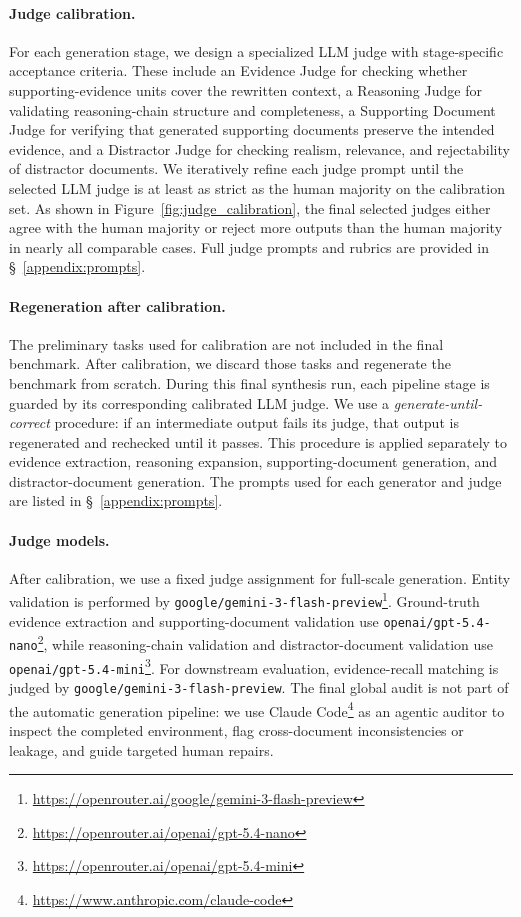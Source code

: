 \documentclass[]{servicenow}
\begin{document}
\paragraph{Judge calibration.}
For each generation stage, we design a specialized LLM judge with stage-specific acceptance criteria. These include an Evidence Judge for checking whether supporting-evidence units cover the rewritten context, a Reasoning Judge for validating reasoning-chain structure and completeness, a Supporting Document Judge for verifying that generated supporting documents preserve the intended evidence, and a Distractor Judge for checking realism, relevance, and rejectability of distractor documents. We iteratively refine each judge prompt until the selected LLM judge is at least as strict as the human majority on the calibration set. As shown in Figure~\ref{fig:judge_calibration}, the final selected judges either agree with the human majority or reject more outputs than the human majority in nearly all comparable cases. Full judge prompts and rubrics are provided in \S~\ref{appendix:prompts}.

\paragraph{Regeneration after calibration.}
The preliminary tasks used for calibration are not included in the final benchmark. After calibration, we discard those tasks and regenerate the benchmark from scratch. During this final synthesis run, each pipeline stage is guarded by its corresponding calibrated LLM judge. We use a \emph{generate-until-correct} procedure: if an intermediate output fails its judge, that output is regenerated and rechecked until it passes. This procedure is applied separately to evidence extraction, reasoning expansion, supporting-document generation, and distractor-document generation. The prompts used for each generator and judge are listed in \S~\ref{appendix:prompts}.

\paragraph{Judge models.}
After calibration, we use a fixed judge assignment for full-scale generation. Entity validation is performed by \texttt{google/gemini-3-flash-preview}\footnote{\url{https://openrouter.ai/google/gemini-3-flash-preview}}. Ground-truth evidence extraction and supporting-document validation use \texttt{openai/gpt-5.4-nano}\footnote{\url{https://openrouter.ai/openai/gpt-5.4-nano}}, while reasoning-chain validation and distractor-document validation use \texttt{openai/gpt-5.4-mini}\footnote{\url{https://openrouter.ai/openai/gpt-5.4-mini}}. For downstream evaluation, evidence-recall matching is judged by \texttt{google/gemini-3-flash-preview}. The final global audit is not part of the automatic generation pipeline: we use Claude Code\footnote{\url{https://www.anthropic.com/claude-code}} as an agentic auditor to inspect the completed environment, flag cross-document inconsistencies or leakage, and guide targeted human repairs.
\end{document}
